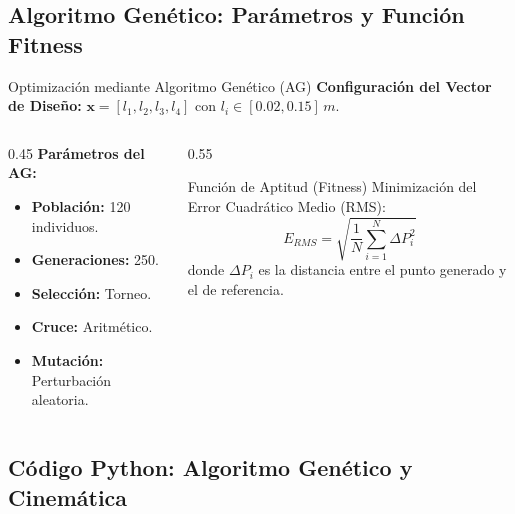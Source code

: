 \documentclass[xcolor={table,dvipsnames}]{beamer}
\begin{document}
\subsection{Algoritmo Gen\'etico: Par\'ametros y Funci\'on Fitness}
\begin{frame}{Optimizaci\'on mediante Algoritmo Gen\'etico (AG)}
    \small
    \textbf{Configuraci\'on del Vector de Dise\~no:}
    \centering $\mathbf{x} = [l_1, l_2, l_3, l_4]$ con $l_i \in [0.02, 0.15]\,m$.

    \begin{columns}[T]
        \begin{column}{0.45\textwidth}
            \textbf{Par\'ametros del AG:}
            \begin{itemize}
                \item \textbf{Poblaci\'on:} 120 individuos.
                \item \textbf{Generaciones:} 250.
                \item \textbf{Selecci\'on:} Torneo.
                \item \textbf{Cruce:} Aritm\'etico.
                \item \textbf{Mutaci\'on:} Perturbaci\'on aleatoria.
            \end{itemize}
        \end{column}

        \begin{column}{0.55\textwidth}
            \begin{exampleblock}{Funci\'on de Aptitud (Fitness)}
                Minimizaci\'on del Error Cuadr\'atico Medio (RMS):
                \[ E_{RMS} = \sqrt{\frac{1}{N} \sum_{i=1}^{N} \Delta P_i^2} \]
                donde $\Delta P_i$ es la distancia entre el punto generado y el de referencia.
            \end{exampleblock}
        \end{column}
    \end{columns}
\end{frame}

\subsection{C\'odigo Python: Algoritmo Gen\'etico y Cinem\'atica}
\end{document}
